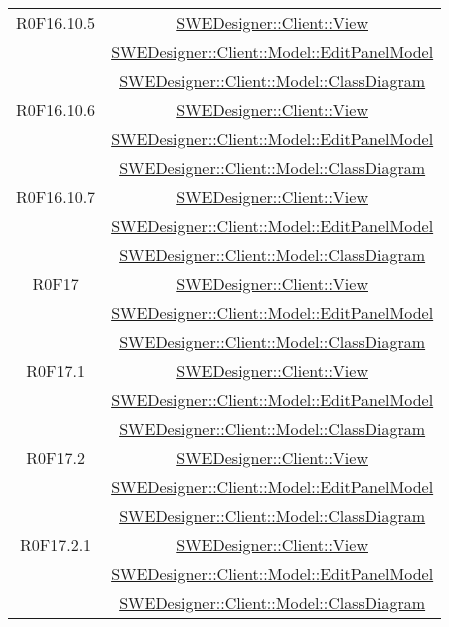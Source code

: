 \documentclass[../SpecificaTecnica.tex]{subfiles}
\begin{document}
\begin{longtable}{|c|c|}
		R0F16.10.5 & \hyperlink{SWEDesigner::Client::View}{SWEDesigner::Client::View} \\& \hyperlink{SWEDesigner::Client::Model::EditPanelModel}{SWEDesigner::Client::Model::EditPanelModel} \\& \hyperlink{SWEDesigner::Client::Model::ClassDiagram}{SWEDesigner::Client::Model::ClassDiagram}\\\hline
		R0F16.10.6 & \hyperlink{SWEDesigner::Client::View}{SWEDesigner::Client::View} \\& \hyperlink{SWEDesigner::Client::Model::EditPanelModel}{SWEDesigner::Client::Model::EditPanelModel} \\& \hyperlink{SWEDesigner::Client::Model::ClassDiagram}{SWEDesigner::Client::Model::ClassDiagram}\\\hline
		R0F16.10.7 & \hyperlink{SWEDesigner::Client::View}{SWEDesigner::Client::View} \\& \hyperlink{SWEDesigner::Client::Model::EditPanelModel}{SWEDesigner::Client::Model::EditPanelModel} \\& \hyperlink{SWEDesigner::Client::Model::ClassDiagram}{SWEDesigner::Client::Model::ClassDiagram}\\\hline
		R0F17 & \hyperlink{SWEDesigner::Client::View}{SWEDesigner::Client::View} \\& \hyperlink{SWEDesigner::Client::Model::EditPanelModel}{SWEDesigner::Client::Model::EditPanelModel} \\& \hyperlink{SWEDesigner::Client::Model::ClassDiagram}{SWEDesigner::Client::Model::ClassDiagram}\\\hline
		R0F17.1 & \hyperlink{SWEDesigner::Client::View}{SWEDesigner::Client::View} \\& \hyperlink{SWEDesigner::Client::Model::EditPanelModel}{SWEDesigner::Client::Model::EditPanelModel} \\& \hyperlink{SWEDesigner::Client::Model::ClassDiagram}{SWEDesigner::Client::Model::ClassDiagram}\\\hline
		R0F17.2 & \hyperlink{SWEDesigner::Client::View}{SWEDesigner::Client::View} \\& \hyperlink{SWEDesigner::Client::Model::EditPanelModel}{SWEDesigner::Client::Model::EditPanelModel} \\& \hyperlink{SWEDesigner::Client::Model::ClassDiagram}{SWEDesigner::Client::Model::ClassDiagram}\\\hline
		R0F17.2.1 & \hyperlink{SWEDesigner::Client::View}{SWEDesigner::Client::View} \\& \hyperlink{SWEDesigner::Client::Model::EditPanelModel}{SWEDesigner::Client::Model::EditPanelModel} \\& \hyperlink{SWEDesigner::Client::Model::ClassDiagram}{SWEDesigner::Client::Model::ClassDiagram}\\\hline

\end{longtable}
\end{document}
